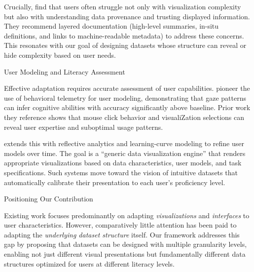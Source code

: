 \documentclass[]{hdsr}
\makeatletter
\def\subsection{\@startsection{subsection}{2}%
  \z@{.5\linespacing\@plus.7\linespacing}{.5\linespacing}%
  {\normalfont\bfseries}}
\theoremstyle{plain}      %
\theoremstyle{definition} %
\theoremstyle{remark}     %
\makeatother
\begin{document}
\noindent Crucially, \citeauthor{alhamadi2022dataqualitymismatched} find that users often struggle not only with visualization complexity but also with understanding data provenance and trusting displayed information. They recommend layered documentation (high-level summaries, in-situ definitions, and links to machine-readable metadata) to address these concerns. This resonates with our goal of designing datasets whose structure can reveal or hide complexity based on user needs.

\subsection{User Modeling and Literacy Assessment}

\noindent Effective adaptation requires accurate assessment of user capabilities. \citet{steichen2013useradaptiveinformationvisualisation} pioneer the use of behavioral telemetry for user modeling, demonstrating that gaze patterns can infer cognitive abilities with accuracy significantly above baseline. Prior work they reference shows that mouse click behavior and visualiZation selections can reveal user expertise and suboptimal usage patterns.

\vspace{1em}

\noindent \citet{amyrotos2021adaptivevisualisationsfor} extends this with reflective analytics and learning-curve modeling to refine user models over time. The goal is a ``generic data visualization engine'' that renders appropriate visualizations based on data characteristics, user models, and task specifications. Such systems move toward the vision of intuitive datasets that automatically calibrate their presentation to each user's proficiency level.

\subsection{Positioning Our Contribution}

\noindent Existing work focuses predominantly on adapting \textit{visualizations} and \textit{interfaces} to user characteristics. However, comparatively little attention has been paid to adapting the \textit{underlying dataset structure} itself. Our framework addresses this gap by proposing that datasets can be designed with multiple granularity levels, enabling not just different visual presentations but fundamentally different data structures optimized for users at different literacy levels.
\end{document}
